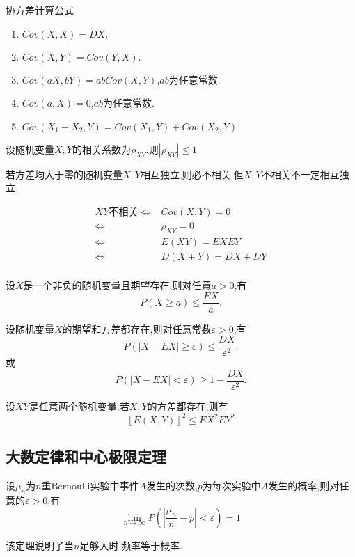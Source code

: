 协方差计算公式
\begin{enumerate}
\item $Cov(X,X)=DX.$
\item $Cov(X,Y)=Cov(Y,X).$
\item $Cov(aX,bY)=abCov(X,Y)$,$ab$为任意常数.
\item $Cov(a,X)=0$,$ab$为任意常数.
\item $Cov(X_1+X_2,Y)=Cov(X_1,Y)+Cov(X_2,Y).$
\end{enumerate}

设随机变量$X,Y$的相关系数为$\rho_{XY}$,则$\left\lvert \rho_{XY}\right\rvert \leqslant 1$
\begin{ttheorem}[（独立性与不相关性）]
    若方差均大于零的随机变量$X,Y$相互独立,则必不相关.但$X,Y$不相关不一定相互独立.
\end{ttheorem}
\begin{align*}
    XY\text{不相关}\iff &Cov(X,Y)=0\\
    \iff &\rho_{XY}=0\\
    \iff &E(XY)=EXEY\\
    \iff &D(X\pm Y)=DX+DY\\
\end{align*}
\begin{ttheorem}[（Markov不等式）]
    设$X$是一个非负的随机变量且期望存在,则对任意$a>0$,有\[
    P(X\geqslant  a)\leqslant \frac{EX}{a}.\]
\end{ttheorem}
\begin{ttheorem}[（Chebyshev不等式）]
    设随机变量$X$的期望和方差都存在,则对任意常数$\varepsilon >0$,有\[
    P(\left\lvert X-EX \right\rvert \geqslant \varepsilon )\leqslant  \frac{DX}{\varepsilon ^2}.\]或\[
    P(\left\lvert X-EX \right\rvert < \varepsilon )\geqslant 1-  \frac{DX}{\varepsilon ^2}.\]
\end{ttheorem}
\begin{ttheorem}
    设$XY$是任意两个随机变量,若$X,Y$的方差都存在,则有\[
    [E(X,Y)]^2\leqslant EX^2EY^2\]
\end{ttheorem}
\subsection{大数定律和中心极限定理}
\begin{theorem}[Bernoulli大数定律]
    设$\mu_n$为$n$重Bernoulli实验中事件$A$发生的次数,$p$为每次实验中$A$发生的概率,则对任意的$\varepsilon >0$,有\[
    \lim_{n \to \infty}P(\left\lvert \frac{\mu_n}{n}-p \right\rvert< \varepsilon )=1  \]
\end{theorem}
该定理说明了当$n$足够大时,频率等于概率.

